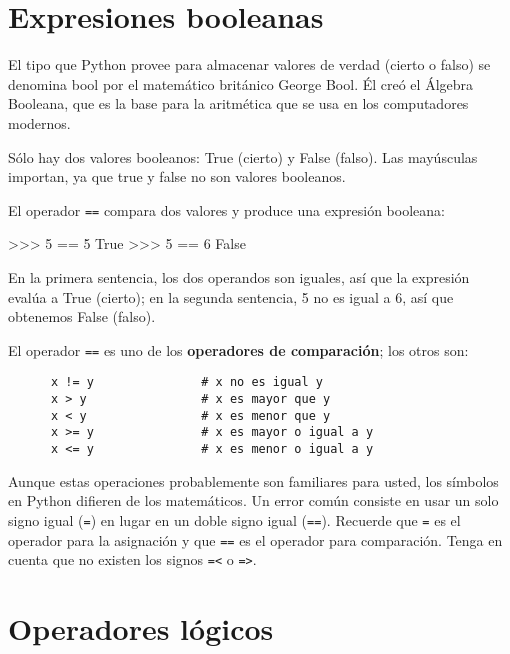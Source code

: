 
\section{Expresiones booleanas}

El tipo que Python provee para almacenar valores de verdad (cierto o falso)
se denomina bool por el matemático británico George Bool. Él creó el
Álgebra Booleana, que es la base para la aritmética que se usa en 
los computadores modernos.

Sólo hay dos valores booleanos: True (cierto) y False (falso). Las mayúsculas importan, ya que true y false no son valores booleanos.

El operador \texttt{==} compara dos valores y produce una expresión  booleana:

\beforeverb
\begin{pyconcode}
>>> 5 == 5
True
>>> 5 == 6
False
\end{pyconcode}
\afterverb
%

En la primera sentencia, los dos operandos son iguales, así que la expresión
evalúa a True (cierto); en la segunda sentencia, 5 no es igual a 6, así que
obtenemos False (falso).

El operador \texttt{==} es uno de los  {\bf operadores de comparación}; los 
otros son:

\beforeverb
\begin{verbatim}
      x != y               # x no es igual y
      x > y                # x es mayor que y
      x < y                # x es menor que y
      x >= y               # x es mayor o igual a y
      x <= y               # x es menor o igual a y
\end{verbatim}
\afterverb
%

Aunque estas operaciones probablemente son familiares para usted, los
símbolos en Python difieren de los matemáticos. Un error común consiste
en usar un solo signo igual (\texttt{=}) en lugar en un doble signo igual
(\texttt{==}).  Recuerde que \texttt{=} es el operador para la asignación y que
\texttt{==} es el operador para comparación.  Tenga en cuenta que
no existen los signos \texttt{=<} o \texttt{=>}.


\section {Operadores lógicos}

